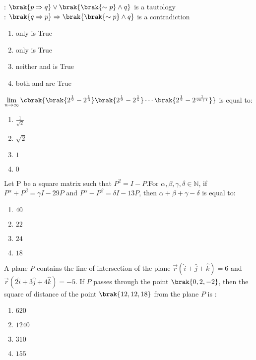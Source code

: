 	: $\brak{p \Rightarrow q} \vee \brak{\brak{\sim p}\wedge q}$ is a tautology\\
		: $\brak{q \Rightarrow p} \Rightarrow \brak{\brak{\sim p}\wedge q}$ is a contradiction  \hfill{}
    \begin{enumerate}
	    \item only  is True
	    \item only  is True
	    \item neither  and  is True
	    \item both  and  are True
    \end{enumerate}
    \item $\displaystyle \lim_{n \to \infty} \cbrak{ \brak{ 2^{\frac{1}{2}} -2^{\frac{1}{3}}} \brak{2^{\frac{1}{2}} - 2^{\frac{1}{5}} } \cdots \brak{2^{\frac{1}{2}} - 2^{\frac{1}{2n+1}}}}$ is equal to: \hfill{}
    \begin{enumerate}
        \item $\frac{1}{\sqrt{2}}$
        \item $\sqrt{2}$
        \item $1$
        \item $0$
    \end{enumerate}
    \item Let P be a square matrix such that $P^2 = I-P$.For $\alpha , \beta, \gamma, \delta \in \mathbb{N}$, if  $P^{\alpha}+P^{\beta}=\gamma I-29 P$ and $P^{\alpha}-P^{\beta}=\delta I-13P$, then $\alpha +\beta+ \gamma-\delta$ is equal to: \hfill{}
	    \begin{enumerate}
        \item $40$    
 \item $22$    
        \item $24$     
        \item $18$     
    \end{enumerate}    
   \item A plane $P$ contains the line of intersection of the plane $ \overrightarrow{r} ( \hat {i} + \hat{j} + \hat{k}) = 6$ and $\overrightarrow{r} (2\hat {i} + 3\hat{j} + 4\hat{k}) = -5 $. If  $P$ passes through the point  $\brak{0, 2, -2}$, then the square of distance of the point $\brak{12, 12, 18}$ from the plane $P$ is : \hfill{}
\begin{enumerate}
        \item $620$                   
        \item $1240$          
        \item $310$     
        \item $155$     
    \end{enumerate}
